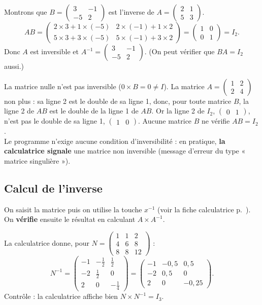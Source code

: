\documentclass[a4paper,11pt]{article}
\newcommand{\M}[1]{\begin{pmatrix}#1\end{pmatrix}}
\begin{document}
\begin{exemple}\label{ex:verifinverse}
Montrons que $B=\M{3 & -1\\ -5 & 2}$ est l'inverse de $A=\M{2 & 1\\ 5 & 3}$.
\[
AB = \M{2\times 3 + 1\times(-5) & 2\times(-1) + 1\times 2\\ 5\times 3 + 3\times(-5) & 5\times(-1) + 3\times 2} = \M{1 & 0\\ 0 & 1} = I_2.
\]
Donc $A$ est inversible et $A^{-1} = \M{3 & -1\\ -5 & 2}$. (On peut vérifier que $BA = I_2$ aussi.)
\end{exemple}

\begin{attention}\label{att:noninversible}
La matrice nulle n'est pas inversible ($0\times B = 0 \neq I$). La matrice $A=\M{1 & 2\\ 2 & 4}$ non plus : sa ligne 2 est le double de sa ligne 1, donc, pour toute matrice $B$, la ligne 2 de $AB$ est le double de la ligne 1 de $AB$. Or la ligne 2 de $I_2$, $\M{0 & 1}$, n'est pas le double de sa ligne 1, $\M{1 & 0}$. Aucune matrice $B$ ne vérifie $AB = I_2$.\\
Le programme n'exige aucune condition d'inversibilité : en pratique, \textbf{la calculatrice signale} une matrice non inversible (message d'erreur du type « matrice singulière »).
\end{attention}

\subsection{Calcul de l'inverse}\label{subsec:calculinverse}

\begin{methode}\label{meth:inversecalc}
On saisit la matrice puis on utilise la touche $x^{-1}$ (voir la fiche calculatrice p.~\pageref{fiche:calc}). On \textbf{vérifie} ensuite le résultat en calculant $A\times A^{-1}$.
\end{methode}

\begin{exemple}\label{ex:inverseN}
La calculatrice donne, pour $N=\M{1 & 1 & 2\\ 4 & 6 & 8\\ 8 & 8 & 12}$ :
\[
N^{-1} = \M{-1 & -\frac{1}{2} & \frac{1}{2}\\[2pt] -2 & \frac{1}{2} & 0\\[2pt] 2 & 0 & -\frac{1}{4}}
= \M{-1 & -0{,}5 & 0{,}5\\ -2 & 0{,}5 & 0\\ 2 & 0 & -0{,}25}.
\]
Contrôle : la calculatrice affiche bien $N\times N^{-1} = I_3$.
\end{exemple}
\end{document}
